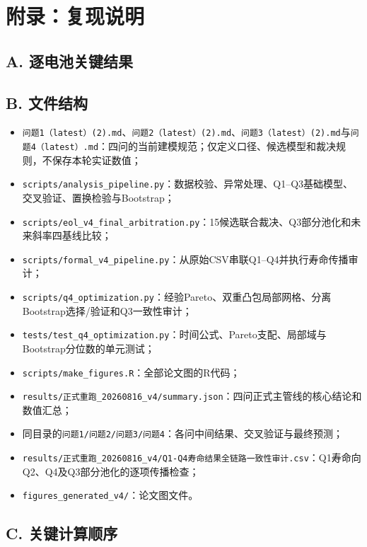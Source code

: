 \documentclass[withoutpreface]{cumcmthesis}
\begin{document}
\newpage
\section*{附录：复现说明}

\subsection*{A. 逐电池关键结果}



\subsection*{B. 文件结构}

\begin{itemize}
  \item \texttt{问题1（latest）(2).md}、\texttt{问题2（latest）(2).md}、\texttt{问题3（latest）(2).md}与\texttt{问题4（latest）.md}：四问的当前建模规范；仅定义口径、候选模型和裁决规则，不保存本轮实证数值；
  \item \texttt{scripts/analysis\_pipeline.py}：数据校验、异常处理、Q1--Q3基础模型、交叉验证、置换检验与Bootstrap；
  \item \texttt{scripts/eol\_v4\_final\_arbitration.py}：15候选联合裁决、Q3部分池化和未来斜率四基线比较；
  \item \texttt{scripts/formal\_v4\_pipeline.py}：从原始CSV串联Q1--Q4并执行寿命传播审计；
  \item \texttt{scripts/q4\_optimization.py}：经验Pareto、双重凸包局部网格、分离Bootstrap选择/验证和Q3一致性审计；
  \item \texttt{tests/test\_q4\_optimization.py}：时间公式、Pareto支配、局部域与Bootstrap分位数的单元测试；
  \item \texttt{scripts/make\_figures.R}：全部论文图的R代码；
  \item \texttt{results/正式重跑\_20260816\_v4/summary.json}：四问正式主管线的核心结论和数值汇总；
  \item 同目录的\texttt{问题1/问题2/问题3/问题4}：各问中间结果、交叉验证与最终预测；
  \item \texttt{results/正式重跑\_20260816\_v4/Q1-Q4寿命结果全链路一致性审计.csv}：Q1寿命向Q2、Q4及Q3部分池化的逐项传播检查；
  \item \texttt{figures\_generated\_v4/}：论文图文件。
\end{itemize}

\subsection*{C. 关键计算顺序}
\end{document}
